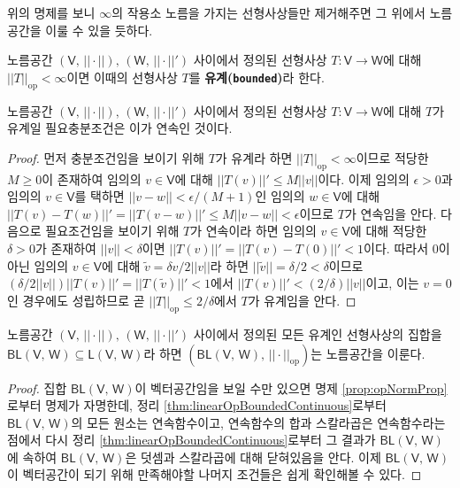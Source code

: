 위의 명제를 보니 $\infty$의 작용소 노름을 가지는 선형사상들만 제거해주면 그 위에서 노름공간을 이룰 수 있을 듯하다.

\begin{definition}
    노름공간 $(\mathsf{V},\,||\cdot||),\,(\mathsf{W},\,||\cdot||')$ 사이에서 정의된 선형사상 $T:\mathsf{V}\to\mathsf{W}$에 대해 $||T||_\mathrm{op}<\infty$이면 이때의 선형사상 $T$를 \textbf{유계(\texttt{bounded})}라 한다.
\end{definition}

\begin{theorem}\label{thm:linearOpBoundedContinuous}
    노름공간 $(\mathsf{V},\,||\cdot||),\,(\mathsf{W},\,||\cdot||')$ 사이에서 정의된 선형사상 $T:\mathsf{V}\to\mathsf{W}$에 대해 $T$가 유계일 필요충분조건은 이가 연속인 것이다.
\end{theorem}

\begin{proof}
    먼저 충분조건임을 보이기 위해 $T$가 유계라 하면 $||T||_\mathrm{op}<\infty$이므로 적당한 $M\geq0$이 존재하여 임의의 $v\in\mathsf{V}$에 대해 $||T(v)||'\leq M||v||$이다. 이제 임의의 $\epsilon>0$과 임의의 $v\in\mathsf{V}$를 택하면 $||v-w||<\epsilon/(M+1)$인 임의의 $w\in\mathsf{V}$에 대해 $||T(v)-T(w)||'=||T(v-w)||'\leq M||v-w||<\epsilon$이므로 $T$가 연속임을 안다. 다음으로 필요조건임을 보이기 위해 $T$가 연속이라 하면 임의의 $v\in\mathsf{V}$에 대해 적당한 $\delta>0$가 존재하여 $||v||<\delta$이면 $||T(v)||'=||T(v)-T(0)||'<1$이다. 따라서 $0$이 아닌 임의의 $v\in\mathsf{V}$에 대해 $\widetilde{v}=\delta v/2||v||$라 하면 $||\widetilde{v}||=\delta/2<\delta$이므로 $(\delta/2||v||)||T(v)||'=||T(\widetilde{v})||'<1$에서 $||T(v)||'<(2/\delta)||v||$이고, 이는 $v=0$인 경우에도 성립하므로 곧 $||T||_\mathrm{op}\leq2/\delta$에서 $T$가 유계임을 안다.
\end{proof}

\begin{proposition}\label{prop:boundedLinearMapNormSpace}
    노름공간 $(\mathsf{V},\,||\cdot||),\,(\mathsf{W},\,||\cdot||')$ 사이에서 정의된 모든 유계인 선형사상의 집합을 $\mathsf{BL}(\mathsf{V},\,\mathsf{W})\subseteq\mathsf{L}(\mathsf{V},\,\mathsf{W})$라 하면 $(\mathsf{BL}(\mathsf{V},\,\mathsf{W}),\,||\cdot||_\mathrm{op})$는 노름공간을 이룬다.
\end{proposition}

\begin{proof}
    집합 $\mathsf{BL}(\mathsf{V},\,\mathsf{W})$이 벡터공간임을 보일 수만 있으면 명제 \ref{prop:opNormProp}로부터 명제가 자명한데, 정리 \ref{thm:linearOpBoundedContinuous}로부터 $\mathsf{BL}(\mathsf{V},\,\mathsf{W})$의 모든 원소는 연속함수이고, 연속함수의 합과 스칼라곱은 연속함수라는 점에서 다시 정리 \ref{thm:linearOpBoundedContinuous}로부터 그 결과가 $\mathsf{BL}(\mathsf{V},\,\mathsf{W})$에 속하여 $\mathsf{BL}(\mathsf{V},\,\mathsf{W})$은 덧셈과 스칼라곱에 대해 닫혀있음을 안다. 이제 $\mathsf{BL}(\mathsf{V},\,\mathsf{W})$이 벡터공간이 되기 위해 만족해야할 나머지 조건들은 쉽게 확인해볼 수 있다.
\end{proof}

